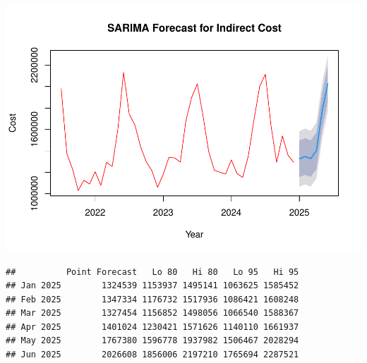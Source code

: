 \documentclass[
]{article}
\begin{document}
\includegraphics{Indirect-Cost-Forecasting-Report_files/figure-latex/unnamed-chunk-2-1.pdf}

\begin{verbatim}
##          Point Forecast   Lo 80   Hi 80   Lo 95   Hi 95
## Jan 2025        1324539 1153937 1495141 1063625 1585452
## Feb 2025        1347334 1176732 1517936 1086421 1608248
## Mar 2025        1327454 1156852 1498056 1066540 1588367
## Apr 2025        1401024 1230421 1571626 1140110 1661937
## May 2025        1767380 1596778 1937982 1506467 2028294
## Jun 2025        2026608 1856006 2197210 1765694 2287521
\end{verbatim}
\end{document}
